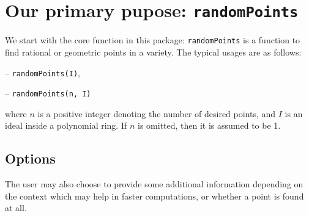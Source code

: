 \documentclass[11pt]{amsart}
\theoremstyle{definition}
\begin{document}
\section{Our primary pupose: {\tt randomPoints}}\label{randomPoints}
    We start with the core function in this package:  {\tt randomPoints} is a function to find rational or geometric points in a variety. The typical usages are as follows: 

    \vspace{0.5em}
    -- {\tt randomPoints(I)}, 

    -- {\tt randomPoints(n, I)} 

    \vspace{0.5em}
    \noindent where $n$ is a positive integer denoting the number of desired points, and 
    $I$ is an ideal inside a polynomial ring.  If {$ n$} is omitted, then it is assumed to be 1.


    \subsection{Options}\label{strategydetails}

    The user may also choose to provide some additional information depending on the context which may help in faster computations, or whether a point is found at all.
\end{document}
